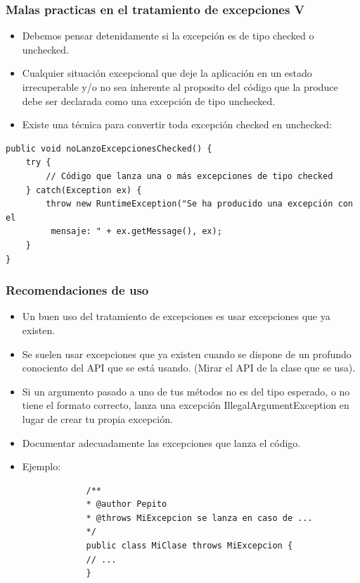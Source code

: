 \documentclass{beamer}
\begin{document}
\begin{frame}[fragile]
\frametitle{Malas practicas en el tratamiento de excepciones V}
\begin{itemize}[<+->]
\item Debemos pensar detenidamente si la excepción es de tipo checked o unchecked.
\item Cualquier situación excepcional que deje la aplicación en un estado irrecuperable y/o no sea inherente al proposito del código que la produce debe ser declarada como una excepción de tipo unchecked.
\item Existe una técnica para convertir toda excepción checked en unchecked:
\end{itemize}
\begin{scriptsize}
\begin{verbatim}
public void noLanzoExcepcionesChecked() { 
    try { 
        // Código que lanza una o más excepciones de tipo checked 
    } catch(Exception ex) { 
        throw new RuntimeException("Se ha producido una excepción con el
         mensaje: " + ex.getMessage(), ex); 
    } 
}
\end{verbatim}
\end{scriptsize}
\end{frame}

\begin{frame}[fragile]
\frametitle{Recomendaciones de uso}
\begin{itemize}[<+->]
\item Un buen uso del tratamiento de excepciones es usar excepciones que ya existen.
\item Se suelen usar excepciones que ya existen cuando se dispone de un profundo conociento del API que se está usando. (Mirar el API de la clase que se usa).
\item Si un argumento pasado a uno de tus métodos no es del tipo esperado, o no tiene el formato correcto, lanza una excepción IllegalArgumentException en lugar de crear tu propia excepción.
\item Documentar adecuadamente las excepciones que lanza el código.
\item Ejemplo:
\end{itemize}
\pause
\begin{tiny}
\begin{verbatim}
                /** 
                * @author Pepito  
                * @throws MiExcepcion se lanza en caso de ... 
                */ 
                public class MiClase throws MiExcepcion { 
                // ... 
                }
\end{verbatim}
\end{tiny}
\end{frame}
\end{document}
